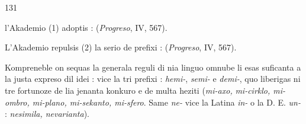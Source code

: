 \begin{VUpage}[135]{131}

\VUcontinue
{} l'Akademio (1) adoptis : \nl
{} (\textit{Progreso}, IV, 567).

L'Akademio repulsis (2) la serio de prefixi : \nl
{} (\textit{Progreso}, IV, 567).

Kompreneble on sequas la generala reguli di nia linguo\nl
omnube li esas suficanta a la justa expreso dil idei : \nl
vice la tri prefixi : \textit{hemi-}, \textit{semi-} e \textit{demi-}, quo liberigas ni tre\nl
fortunoze de lia jenanta konkuro e de multa heziti (\textit{mi-axo,}\nl
\textit{mi-cirklo, mi-ombro, mi-plano, mi-sekanto, mi-sfero}. Same\nl
\textit{ne-} vice la Latina \textit{in-} o la D. E. \textit{un-} : \textit{nesimila, nevarianta}).\parplein

\VUsaut{7.74mm}
\VUsaut{4.45mm}


\end{VUpage}
